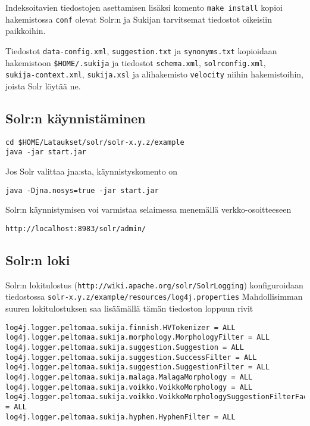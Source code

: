 \documentclass[12pt,a4paper]{scrartcl}
\begin{document}
Indeksoitavien tiedostojen asettamisen lisäksi komento
\verb=make install= kopioi hakemistossa \verb=conf= olevat Solr:n ja
Sukijan tarvitsemat tiedostot oikeisiin paikkoihin.

Tiedostot
\verb=data-config.xml=,
\verb=suggestion.txt= ja
\verb=synonyms.txt=
kopioidaan hakemistoon \verb=$HOME/.sukija=
ja tiedostot
\verb=schema.xml=,
\verb=solrconfig.xml=, \\
\verb=sukija-context.xml=,
\verb=sukija.xsl= ja
alihakemisto \verb=velocity=
niihin hakemistoihin, joista Solr löytää ne.


\subsection*{Solr:n käynnistäminen}

\begin{verbatim}
cd $HOME/Lataukset/solr/solr-x.y.z/example
java -jar start.jar
\end{verbatim}

Jos Solr valittaa jna:sta, käynnistyskomento on

\begin{verbatim}
java -Djna.nosys=true -jar start.jar
\end{verbatim}

Solr:n käynnistymisen voi varmistaa selaimessa menemällä verkko-osoitteeseen

\verb|http://localhost:8983/solr/admin/|


\subsection*{Solr:n loki}

Solr:n lokitulostus (\verb=http://wiki.apache.org/solr/SolrLogging=)
konfiguroidaan tiedostossa
\verb=solr-x.y.z/example/resources/log4j.properties=
Mahdollisimman suuren lokitulostuksen saa lisäämällä tämän tiedoston
loppuun rivit

\begin{verbatim}
log4j.logger.peltomaa.sukija.finnish.HVTokenizer = ALL
log4j.logger.peltomaa.sukija.morphology.MorphologyFilter = ALL
log4j.logger.peltomaa.sukija.suggestion.Suggestion = ALL
log4j.logger.peltomaa.sukija.suggestion.SuccessFilter = ALL
log4j.logger.peltomaa.sukija.suggestion.SuggestionFilter = ALL
log4j.logger.peltomaa.sukija.malaga.MalagaMorphology = ALL
log4j.logger.peltomaa.sukija.voikko.VoikkoMorphology = ALL
log4j.logger.peltomaa.sukija.voikko.VoikkoMorphologySuggestionFilterFactory = ALL
log4j.logger.peltomaa.sukija.hyphen.HyphenFilter = ALL
\end{verbatim}
\end{document}
